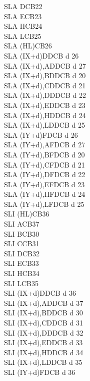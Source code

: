 \begin{multicols}{3}
{\begin{tabbing}
		SLA D\>CB22\\
		SLA E\>CB23\\
		SLA H\>CB24\\
		SLA L\>CB25\\
		SLA (HL)\>CB26\\
		SLA (IX+d)\>DDCB d 26\\
		SLA (IX+d),A\UNDOC\>DDCB d 27\\
		SLA (IX+d),B\UNDOC\>DDCB d 20\\
		SLA (IX+d),C\UNDOC\>DDCB d 21\\
		SLA (IX+d),D\UNDOC\>DDCB d 22\\
		SLA (IX+d),E\UNDOC\>DDCB d 23\\
		SLA (IX+d),H\UNDOC\>DDCB d 24\\
		SLA (IX+d),L\UNDOC\>DDCB d 25\\
		SLA (IY+d)\>FDCB d 26\\
		SLA (IY+d),A\UNDOC\>FDCB d 27\\
		SLA (IY+d),B\UNDOC\>FDCB d 20\\
		SLA (IY+d),C\UNDOC\>FDCB d 21\\
		SLA (IY+d),D\UNDOC\>FDCB d 22\\
		SLA (IY+d),E\UNDOC\>FDCB d 23\\
		SLA (IY+d),H\UNDOC\>FDCB d 24\\
		SLA (IY+d),L\UNDOC\>FDCB d 25\\
		SLI (HL)\UNDOC\>CB36\\
		SLI A\UNDOC\>CB37\\
		SLI B\UNDOC\>CB30\\
		SLI C\UNDOC\>CB31\\
		SLI D\UNDOC\>CB32\\
		SLI E\UNDOC\>CB33\\
		SLI H\UNDOC\>CB34\\
		SLI L\UNDOC\>CB35\\
		SLI (IX+d)\UNDOC\>DDCB d 36\\
		SLI (IX+d),A\UNDOC\>DDCB d 37\\
		SLI (IX+d),B\UNDOC\>DDCB d 30\\
		SLI (IX+d),C\UNDOC\>DDCB d 31\\
		SLI (IX+d),D\UNDOC\>DDCB d 32\\
		SLI (IX+d),E\UNDOC\>DDCB d 33\\
		SLI (IX+d),H\UNDOC\>DDCB d 34\\
		SLI (IX+d),L\UNDOC\>DDCB d 35\\
		SLI (IY+d)\UNDOC\>FDCB d 36\\

\end{tabbing}}
\end{multicols}
